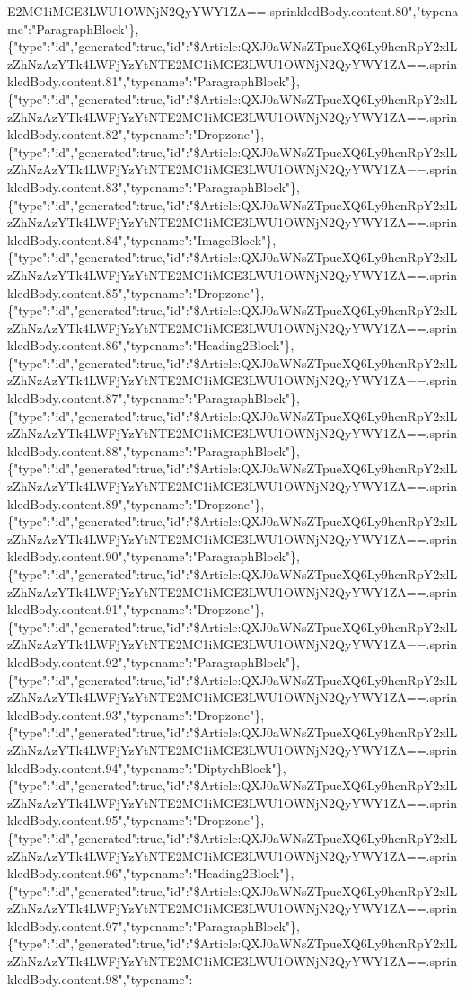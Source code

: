 E2MC1iMGE3LWU1OWNjN2QyYWY1ZA==.sprinkledBody.content.80","typename":"ParagraphBlock"\},\{"type":"id","generated":true,"id":"\$Article:QXJ0aWNsZTpueXQ6Ly9hcnRpY2xlLzZhNzAzYTk4LWFjYzYtNTE2MC1iMGE3LWU1OWNjN2QyYWY1ZA==.sprinkledBody.content.81","typename":"ParagraphBlock"\},\{"type":"id","generated":true,"id":"\$Article:QXJ0aWNsZTpueXQ6Ly9hcnRpY2xlLzZhNzAzYTk4LWFjYzYtNTE2MC1iMGE3LWU1OWNjN2QyYWY1ZA==.sprinkledBody.content.82","typename":"Dropzone"\},\{"type":"id","generated":true,"id":"\$Article:QXJ0aWNsZTpueXQ6Ly9hcnRpY2xlLzZhNzAzYTk4LWFjYzYtNTE2MC1iMGE3LWU1OWNjN2QyYWY1ZA==.sprinkledBody.content.83","typename":"ParagraphBlock"\},\{"type":"id","generated":true,"id":"\$Article:QXJ0aWNsZTpueXQ6Ly9hcnRpY2xlLzZhNzAzYTk4LWFjYzYtNTE2MC1iMGE3LWU1OWNjN2QyYWY1ZA==.sprinkledBody.content.84","typename":"ImageBlock"\},\{"type":"id","generated":true,"id":"\$Article:QXJ0aWNsZTpueXQ6Ly9hcnRpY2xlLzZhNzAzYTk4LWFjYzYtNTE2MC1iMGE3LWU1OWNjN2QyYWY1ZA==.sprinkledBody.content.85","typename":"Dropzone"\},\{"type":"id","generated":true,"id":"\$Article:QXJ0aWNsZTpueXQ6Ly9hcnRpY2xlLzZhNzAzYTk4LWFjYzYtNTE2MC1iMGE3LWU1OWNjN2QyYWY1ZA==.sprinkledBody.content.86","typename":"Heading2Block"\},\{"type":"id","generated":true,"id":"\$Article:QXJ0aWNsZTpueXQ6Ly9hcnRpY2xlLzZhNzAzYTk4LWFjYzYtNTE2MC1iMGE3LWU1OWNjN2QyYWY1ZA==.sprinkledBody.content.87","typename":"ParagraphBlock"\},\{"type":"id","generated":true,"id":"\$Article:QXJ0aWNsZTpueXQ6Ly9hcnRpY2xlLzZhNzAzYTk4LWFjYzYtNTE2MC1iMGE3LWU1OWNjN2QyYWY1ZA==.sprinkledBody.content.88","typename":"ParagraphBlock"\},\{"type":"id","generated":true,"id":"\$Article:QXJ0aWNsZTpueXQ6Ly9hcnRpY2xlLzZhNzAzYTk4LWFjYzYtNTE2MC1iMGE3LWU1OWNjN2QyYWY1ZA==.sprinkledBody.content.89","typename":"Dropzone"\},\{"type":"id","generated":true,"id":"\$Article:QXJ0aWNsZTpueXQ6Ly9hcnRpY2xlLzZhNzAzYTk4LWFjYzYtNTE2MC1iMGE3LWU1OWNjN2QyYWY1ZA==.sprinkledBody.content.90","typename":"ParagraphBlock"\},\{"type":"id","generated":true,"id":"\$Article:QXJ0aWNsZTpueXQ6Ly9hcnRpY2xlLzZhNzAzYTk4LWFjYzYtNTE2MC1iMGE3LWU1OWNjN2QyYWY1ZA==.sprinkledBody.content.91","typename":"Dropzone"\},\{"type":"id","generated":true,"id":"\$Article:QXJ0aWNsZTpueXQ6Ly9hcnRpY2xlLzZhNzAzYTk4LWFjYzYtNTE2MC1iMGE3LWU1OWNjN2QyYWY1ZA==.sprinkledBody.content.92","typename":"ParagraphBlock"\},\{"type":"id","generated":true,"id":"\$Article:QXJ0aWNsZTpueXQ6Ly9hcnRpY2xlLzZhNzAzYTk4LWFjYzYtNTE2MC1iMGE3LWU1OWNjN2QyYWY1ZA==.sprinkledBody.content.93","typename":"Dropzone"\},\{"type":"id","generated":true,"id":"\$Article:QXJ0aWNsZTpueXQ6Ly9hcnRpY2xlLzZhNzAzYTk4LWFjYzYtNTE2MC1iMGE3LWU1OWNjN2QyYWY1ZA==.sprinkledBody.content.94","typename":"DiptychBlock"\},\{"type":"id","generated":true,"id":"\$Article:QXJ0aWNsZTpueXQ6Ly9hcnRpY2xlLzZhNzAzYTk4LWFjYzYtNTE2MC1iMGE3LWU1OWNjN2QyYWY1ZA==.sprinkledBody.content.95","typename":"Dropzone"\},\{"type":"id","generated":true,"id":"\$Article:QXJ0aWNsZTpueXQ6Ly9hcnRpY2xlLzZhNzAzYTk4LWFjYzYtNTE2MC1iMGE3LWU1OWNjN2QyYWY1ZA==.sprinkledBody.content.96","typename":"Heading2Block"\},\{"type":"id","generated":true,"id":"\$Article:QXJ0aWNsZTpueXQ6Ly9hcnRpY2xlLzZhNzAzYTk4LWFjYzYtNTE2MC1iMGE3LWU1OWNjN2QyYWY1ZA==.sprinkledBody.content.97","typename":"ParagraphBlock"\},\{"type":"id","generated":true,"id":"\$Article:QXJ0aWNsZTpueXQ6Ly9hcnRpY2xlLzZhNzAzYTk4LWFjYzYtNTE2MC1iMGE3LWU1OWNjN2QyYWY1ZA==.sprinkledBody.content.98","typename":